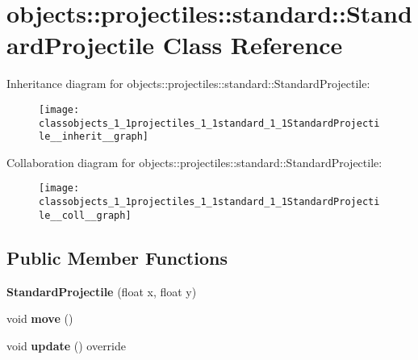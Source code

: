 \hypertarget{classobjects_1_1projectiles_1_1standard_1_1StandardProjectile}{}\section{objects\+:\+:projectiles\+:\+:standard\+:\+:Standard\+Projectile Class Reference}
\label{classobjects_1_1projectiles_1_1standard_1_1StandardProjectile}


Inheritance diagram for objects\+:\+:projectiles\+:\+:standard\+:\+:Standard\+Projectile\+:\nopagebreak
\begin{figure}[H]
\begin{center}
\leavevmode
\texttt{[image: classobjects\_1\_1projectiles\_1\_1standard\_1\_1StandardProjectile\_\_inherit\_\_graph]}
\end{center}
\end{figure}


Collaboration diagram for objects\+:\+:projectiles\+:\+:standard\+:\+:Standard\+Projectile\+:\nopagebreak
\begin{figure}[H]
\begin{center}
\leavevmode
\texttt{[image: classobjects\_1\_1projectiles\_1\_1standard\_1\_1StandardProjectile\_\_coll\_\_graph]}
\end{center}
\end{figure}
\subsection*{Public Member Functions}
\begin{DoxyCompactItemize}
\item 
\mbox{\label{classobjects_1_1projectiles_1_1standard_1_1StandardProjectile_a36a576f2cbb69f86b100a089591f190c}}
{\bfseries Standard\+Projectile} (float x, float y)
\item 
\mbox{\label{classobjects_1_1projectiles_1_1standard_1_1StandardProjectile_a02b8c02279340f88b3143eb75d4257a8}}
void {\bfseries move} ()
\item 
\mbox{\label{classobjects_1_1projectiles_1_1standard_1_1StandardProjectile_a51122df8dc5e0fb55317e18f45c5f24e}}
void {\bfseries update} () override
\end{DoxyCompactItemize}
